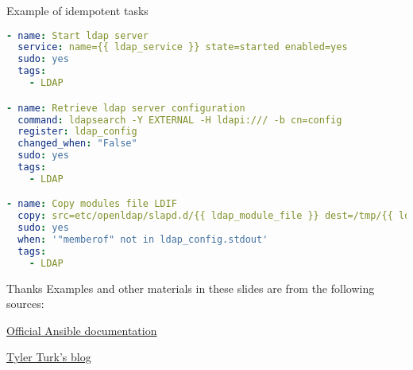 \documentclass[12pt, xcolor={dvipsnames}]{beamer}
\newenvironment{wideitemize}{\itemize\addtolength{\itemsep}{12pt}}{\enditemize}
\begin{document}
\begin{frame}[t, fragile]{Example of idempotent tasks}
  \begin{lstlisting}[language=yaml, basicstyle=\scriptsize]
- name: Start ldap server
  service: name={{ ldap_service }} state=started enabled=yes
  sudo: yes
  tags:
    - LDAP

- name: Retrieve ldap server configuration
  command: ldapsearch -Y EXTERNAL -H ldapi:/// -b cn=config
  register: ldap_config
  changed_when: "False"
  sudo: yes
  tags:
    - LDAP

- name: Copy modules file LDIF
  copy: src=etc/openldap/slapd.d/{{ ldap_module_file }} dest=/tmp/{{ ldap_module_file }}
  sudo: yes
  when: '"memberof" not in ldap_config.stdout'
  tags:
    - LDAP
  \end{lstlisting}
\end{frame}

\begin{frame}[t]{Thanks}
  Examples and other materials in these slides are from the following sources:
  \begin{wideitemize}
    \item \href{http://docs.ansible.com/ansible/index.html}{Official Ansible documentation}
    \item \href{http://tylerturk.com/testing-ansible-idempotency/}{Tyler Turk's blog}
  \end{wideitemize}
\end{frame}
\end{document}

